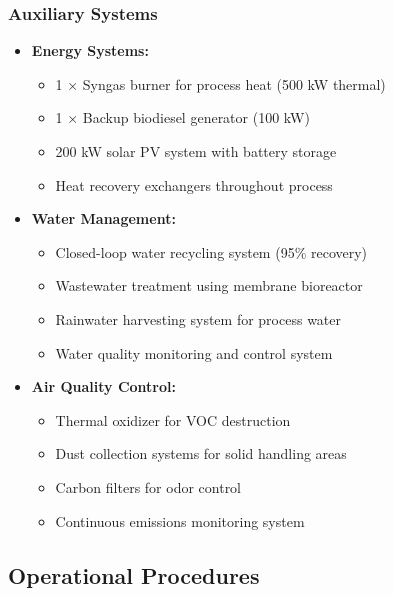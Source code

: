 \subsubsection{Auxiliary Systems}
\begin{itemize}
    \item \textbf{Energy Systems:}
    \begin{itemize}
        \item 1 × Syngas burner for process heat (500 kW thermal)
        \item 1 × Backup biodiesel generator (100 kW)
        \item 200 kW solar PV system with battery storage
        \item Heat recovery exchangers throughout process
    \end{itemize}
    
    \item \textbf{Water Management:}
    \begin{itemize}
        \item Closed-loop water recycling system (95\% recovery)
        \item Wastewater treatment using membrane bioreactor
        \item Rainwater harvesting system for process water
        \item Water quality monitoring and control system
    \end{itemize}
    
    \item \textbf{Air Quality Control:}
    \begin{itemize}
        \item Thermal oxidizer for VOC destruction
        \item Dust collection systems for solid handling areas
        \item Carbon filters for odor control
        \item Continuous emissions monitoring system
    \end{itemize}
\end{itemize}

\subsection{Operational Procedures}

